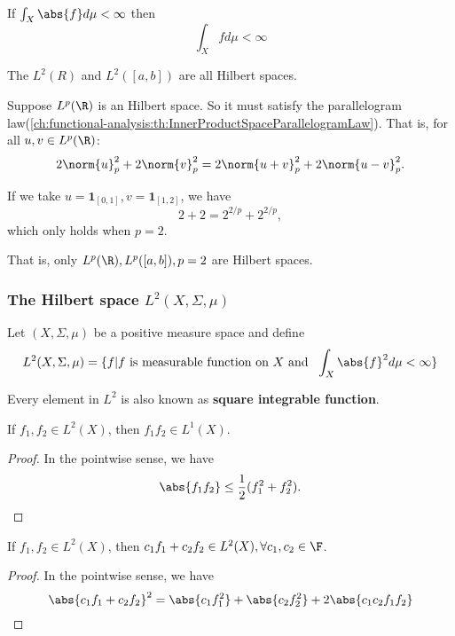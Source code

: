 \begin{refsection}
\begin{lemma}
	If $\int_X \abs{f} d\mu < \infty$ then $$\int_X f d\mu < \infty$$
\end{lemma}

\begin{theorem}\cite[118]{christensen2010functions}
	The $L^2(R)$ and $L^2([a,b])$ are all Hilbert spaces. 
\end{theorem}

\begin{note}\cite[131]{christensen2010functions}
	Suppose $L^p(\R)$ is an Hilbert space. So it must satisfy the parallelogram law(\autoref{ch:functional-analysis:th:InnerProductSpaceParallelogramLaw}). That is, for all $u,v \in L^p(\R)$:
	$$2\norm{u}_p^2 + 2\norm{v}_p^2 = 2\norm{u+v}_p^2 + 2\norm{u-v}_p^2.$$
	
	If we take $u = \bm{1}_{[0,1]},v = \bm{1}_{[1,2]}$, we have
	$$2 + 2 = 2^{2/p} + 2^{2/p},$$
	which only holds when $p=2$. 
	
	That is, only $L^p(\R),L^p([a,b]),p=2$ are Hilbert spaces.	
\end{note}



\subsubsection{The Hilbert space $L^2(X,\Sigma,\mu)$}
\begin{definition}[$L^2$ space] 
	\cite[397]{johnsonbaugh2010foundations} Let $(X,\Sigma,\mu)$ be a positive measure space and define $$L^2(X,\Sigma,\mu)=\{f|f ~ \text{is measurable function on $X$ and } ~ \int_X \abs{f}^2 d\mu < \infty\}$$
\end{definition}

\begin{remark}
	Every element in $L^2$ is also known as \textbf{square integrable function}.
\end{remark}

\begin{lemma}
	\cite[1]{sansone2004orthogonal}If $f_1,f_2 \in L^2(X)$, then $f_1f_2\in L^1(X)$.
\end{lemma}
\begin{proof}
	In the pointwise sense, we have
	$$\abs{f_1f_2} \leq \frac{1}{2}(f_1^2 + f_2^2).$$	
\end{proof}

\begin{lemma}
	\cite[1]{sansone2004orthogonal}If $f_1,f_2 \in L^2(X)$, then $c_1f_1 + c_2f_2\in L^2(X),\forall c_1,c_2 \in \F$.
\end{lemma}
\begin{proof}
	In the pointwise sense, we have
	$$\abs{c_1f_1 + c_2f_2}^2 = \abs{c_1f_1^2} + \abs{c_2f_2^2} +2\abs{c_1c_2f_1f_2}$$	
\end{proof}



\end{refsection}
